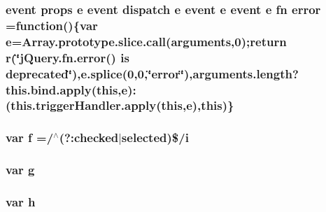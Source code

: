 \hypertarget{jquery-migrate-1_82_81_8min_8js_a5430e5f3d7ed1df717102cddac071a5f}{
\subsubsection[{error}]{ event props {\bf e} event dispatch {\bf e} event {\bf e} event {\bf e} {\bf fn} error =function()\{var {\bf e}={\bf Array.\-prototype.\-slice.\-call}(arguments,0);return {\bf r}(\char`\"{}j\-Query.\-fn.\-error() is deprecated\char`\"{}),e.\-splice(0,0,\char`\"{}error\char`\"{}),arguments.\-length?this.\-bind.\-apply(this,{\bf e})\-:(this.\-trigger\-Handler.\-apply(this,{\bf e}),this)\}}}\label{jquery-migrate-1_82_81_8min_8js_a5430e5f3d7ed1df717102cddac071a5f}
\hypertarget{jquery-migrate-1_82_81_8min_8js_a9cf09a2972472098a4c689fd988f4dfc}{
\subsubsection[{f}]{\setlength{\rightskip}{0pt plus 5cm}var f =/$^\wedge$(?\-:checked$\vert$selected)\$/{\bf i}}}\label{jquery-migrate-1_82_81_8min_8js_a9cf09a2972472098a4c689fd988f4dfc}
\hypertarget{jquery-migrate-1_82_81_8min_8js_a103df269476e78897c9c4c6cb8f4eb06}{
\subsubsection[{g}]{\setlength{\rightskip}{0pt plus 5cm}var g}}\label{jquery-migrate-1_82_81_8min_8js_a103df269476e78897c9c4c6cb8f4eb06}
\hypertarget{jquery-migrate-1_82_81_8min_8js_a79fe0eb780a2a4b5543b4dddf8b6188a}{
\subsubsection[{h}]{\setlength{\rightskip}{0pt plus 5cm}var h}}\label{jquery-migrate-1_82_81_8min_8js_a79fe0eb780a2a4b5543b4dddf8b6188a}
